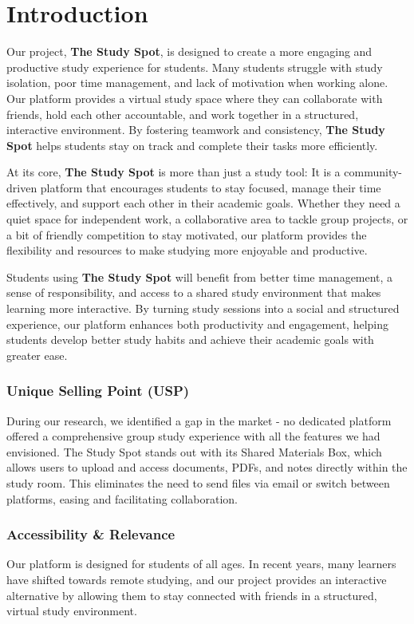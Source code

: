 \chapter{Introduction}
\label{chap:introduction}
Our project, \textbf{The Study Spot}, is designed to create a more engaging and productive study experience for students. Many students struggle with study isolation, poor time management, and lack of motivation when working alone. Our platform provides a virtual study space where they can collaborate with friends, hold each other accountable, and work together in a structured, interactive environment. By fostering teamwork and consistency, \textbf{The Study Spot} helps students stay on track and complete their tasks more efficiently.  

At its core, \textbf{The Study Spot} is more than just a study tool: It is a community-driven platform that encourages students to stay focused, manage their time effectively, and support each other in their academic goals. Whether they need a quiet space for independent work, a collaborative area to tackle group projects, or a bit of friendly competition to stay motivated, our platform provides the flexibility and resources to make studying more enjoyable and productive.  

Students using \textbf{The Study Spot} will benefit from better time management, a sense of responsibility, and access to a shared study environment that makes learning more interactive. By turning study sessions into a social and structured experience, our platform enhances both productivity and engagement, helping students develop better study habits and achieve their academic goals with greater ease.

\subsection*{Unique Selling Point (USP)}
During our research, we identified a gap in the market - no dedicated platform offered a comprehensive group study experience with all the features we had envisioned. The Study Spot stands out with its Shared Materials Box, which allows users to upload and access documents, PDFs, and notes directly within the study room. This eliminates the need to send files via email or switch between platforms, easing and facilitating collaboration.

\subsection*{Accessibility \& Relevance}
Our platform is designed for students of all ages. In recent years, many learners have shifted towards remote studying, and our project provides an interactive alternative by allowing them to stay connected with friends in a structured, virtual study environment.

